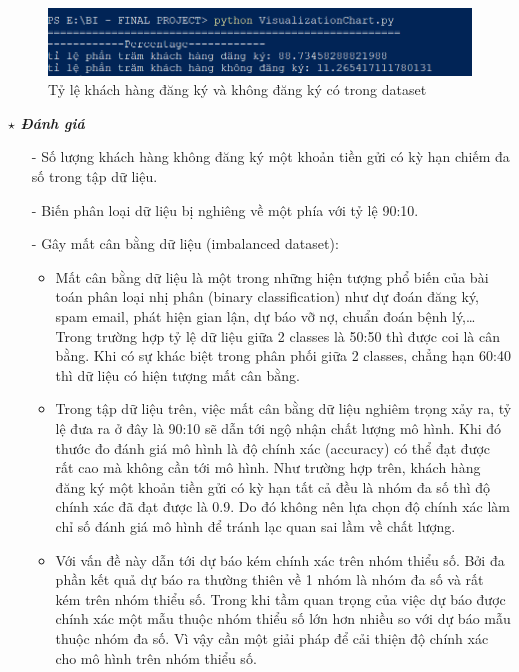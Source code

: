 \documentclass{report}
\begin{document}
        \begin{figure}[htp]
            \centering
            \includegraphics[scale = 0.75]{image/VC.png}
            \caption{Tỷ lệ khách hàng đăng ký và không đăng ký có trong dataset}
        \end{figure}
        
    \pagebreak

    \fontsize{13}{10}\selectfont \textbf{$\star$\textit{ Đánh giá}}
        \begin{enumerate}
            \item [- ] Số lượng khách hàng không đăng ký một khoản tiền gửi có kỳ hạn chiếm đa số trong tập dữ liệu.
            \item [- ] Biến phân loại dữ liệu bị nghiêng về một phía với tỷ lệ 90:10.
            \item [- ] Gây mất cân bằng dữ liệu (imbalanced dataset): 
            \begin{itemize}
                \item Mất cân bằng dữ liệu là một trong những hiện tượng phổ biến của bài toán phân loại nhị phân (binary classification) như dự đoán đăng ký, spam email, phát hiện gian lận, dự báo vỡ nợ, chuẩn đoán bệnh lý,… Trong trường hợp tỷ lệ dữ liệu giữa 2 classes là 50:50 thì được coi là cân bằng. Khi có sự khác biệt trong phân phối giữa 2 classes, chẳng hạn 60:40 thì dữ liệu có hiện tượng mất cân bằng.
                \item Trong tập dữ liệu trên, việc mất cân bằng dữ liệu nghiêm trọng xảy ra, tỷ lệ đưa ra ở đây là 90:10 sẽ dẫn tới ngộ nhận chất lượng mô hình. Khi đó thước đo đánh giá mô hình là độ chính xác (accuracy) có thể đạt được rất cao mà không cần tới mô hình. Như trường hợp trên, khách hàng đăng ký một khoản tiền gửi có kỳ hạn tất cả đều là nhóm đa số thì độ chính xác đã đạt được là 0.9. Do đó không nên lựa chọn độ chính xác làm chỉ số đánh giá mô hình để tránh lạc quan sai lầm về chất lượng.
                \item Với vấn đề này dẫn tới dự báo kém chính xác trên nhóm thiểu số. Bởi đa phần kết quả dự báo ra thường thiên về 1 nhóm là nhóm đa số và rất kém trên nhóm thiểu số. Trong khi tầm quan trọng của việc dự báo được chính xác một mẫu thuộc nhóm thiểu số lớn hơn nhiều so với dự báo mẫu thuộc nhóm đa số. Vì vậy cần một giải pháp để cải thiện độ chính xác cho mô hình trên nhóm thiểu số.
            \end{itemize}
        \end{enumerate}
                 
\end{document}
